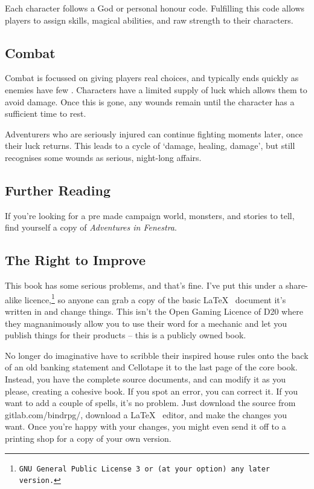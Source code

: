 \begin{multicols}{2}
Each character follows a God or personal honour code.
Fulfilling this code allows players to assign skills, magical abilities, and raw strength to their characters.

\subsection*{Combat}

Combat is focussed on giving players real choices, and typically ends quickly as enemies have few .
Characters have a limited supply of luck which allows them to avoid damage.
Once this is gone, any wounds remain until the character has a sufficient time to rest.

Adventurers who are seriously injured can continue fighting moments later, once their luck returns.
This leads to a cycle of `damage, healing, damage', but still recognises some wounds as serious, night-long affairs.

\subsection*{Further Reading}

If you're looking for a pre made campaign world, monsters, and stories to tell, find yourself a copy of \textit{Adventures in Fenestra}.

\subsection*{The Right to Improve}

\noindent
This book has some serious problems, and that's fine.  I've put this under a share-alike licence,\footnote{\tt GNU General Public License 3 or (at your option) any later version.} so anyone can grab a copy of the basic \LaTeX~ document it's written in and change things.  This isn't the Open Gaming Licence of D20 where they magnanimously allow you to use their word for a mechanic and let you publish things for their products -- this is a publicly owned book.

No longer do imaginative  have to scribble their inspired house rules onto the back of an old banking statement and Cellotape it to the last page of the core book.
Instead, you have the complete source documents, and can modify it as you please, creating a cohesive book.
If you spot an error, you can correct it.
If you want to add a couple of spells, it's no problem.
Just download the source from gitlab.com/bindrpg/, download a \LaTeX~ editor, and make the changes you want.
Once you're happy with your changes, you might even send it off to a printing shop for a copy of your own version.


\end{multicols}
